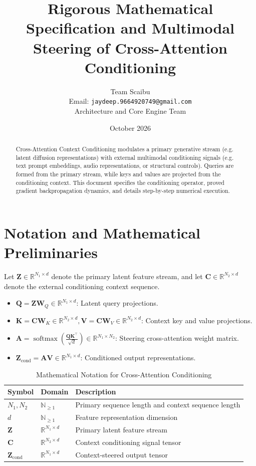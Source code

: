 \documentclass[11pt,a4paper]{article}
\title{\textbf{Rigorous Mathematical Specification and Multimodal Steering of Cross-Attention Conditioning}}
\author{Team Scaibu \\ \small Email: \texttt{jaydeep.9664920749@gmail.com} \\ \small Architecture and Core Engine Team}
\date{October 2026}
\theoremstyle{definition}
\begin{document}
\maketitle

\begin{abstract}
Cross-Attention Context Conditioning modulates a primary generative stream (e.g. latent diffusion representations) with external multimodal conditioning signals (e.g. text prompt embeddings, audio representations, or structural controls). Queries are formed from the primary stream, while keys and values are projected from the conditioning context. This document specifies the conditioning operator, proved gradient backpropagation dynamics, and details step-by-step numerical execution.
\end{abstract}

\section{Notation and Mathematical Preliminaries}

Let $\mathbf{Z} \in \mathbb{R}^{N_1 \times d}$ denote the primary latent feature stream, and let $\mathbf{C} \in \mathbb{R}^{N_2 \times d}$ denote the external conditioning context sequence.

\begin{itemize}
    \item $\mathbf{Q} = \mathbf{Z} \mathbf{W}_Q \in \mathbb{R}^{N_1 \times d}$: Latent query projections.
    \item $\mathbf{K} = \mathbf{C} \mathbf{W}_K \in \mathbb{R}^{N_2 \times d}, \mathbf{V} = \mathbf{C} \mathbf{W}_V \in \mathbb{R}^{N_2 \times d}$: Context key and value projections.
    \item $\mathbf{A} = \operatorname{softmax}\left(\frac{\mathbf{Q}\mathbf{K}^\top}{\sqrt{d}}\right) \in \mathbb{R}^{N_1 \times N_2}$: Steering cross-attention weight matrix.
    \item $\mathbf{Z}_{\text{cond}} = \mathbf{A}\mathbf{V} \in \mathbb{R}^{N_1 \times d}$: Conditioned output representations.
\end{itemize}

\begin{table}[h]
\centering
\caption{Mathematical Notation for Cross-Attention Conditioning}
\begin{tabular}{lll}
\toprule
\textbf{Symbol} & \textbf{Domain} & \textbf{Description} \\
\midrule
$N_1, N_2$ & $\mathbb{N}_{\ge 1}$ & Primary sequence length and context sequence length \\
$d$ & $\mathbb{N}_{\ge 1}$ & Feature representation dimension \\
$\mathbf{Z}$ & $\mathbb{R}^{N_1 \times d}$ & Primary latent feature stream \\
$\mathbf{C}$ & $\mathbb{R}^{N_2 \times d}$ & Context conditioning signal tensor \\
$\mathbf{Z}_{\text{cond}}$ & $\mathbb{R}^{N_1 \times d}$ & Context-steered output tensor \\
\bottomrule
\end{tabular}
\end{table}
\end{document}
